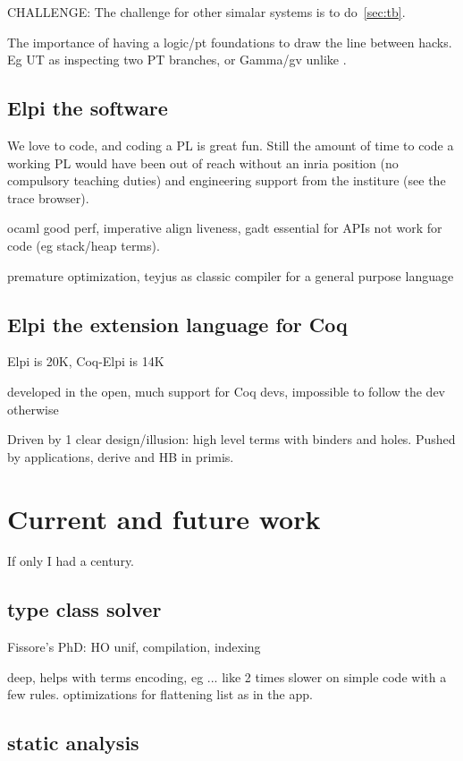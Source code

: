 \documentclass[a4paper, 11pt]{book}
\begin{document}
CHALLENGE: The challenge for other simalar systems is to do~\ref{sec:tb}.

The importance of having a logic/pt foundations to draw the line between hacks.
Eg UT as inspecting two PT branches, or Gamma/gv unlike \cite[Section 8 and later]{10.1145/3236788}.


\subsection{Elpi the software}

We love to code, and coding a PL is great fun. Still the amount of
time to code a working PL would have been out of reach without an inria position
(no compulsory teaching duties) and engineering support from the institure (see
the trace browser).

ocaml good perf, imperative align liveness, gadt essential for APIs not work for code (eg stack/heap terms).

premature optimization, teyjus as classic compiler for a general purpose language

\subsection{Elpi the extension language for Coq}

Elpi is 20K, Coq-Elpi is 14K

developed in the open, much support for Coq devs, impossible to follow the
dev otherwise

Driven by 1 clear design/illusion: high level terms with binders and holes.
Pushed by applications, derive and HB in primis.


\section{Current and future work}

If only I had a century.

\subsection{type class solver}

Fissore's PhD: HO unif, compilation, indexing

deep, helps with terms encoding, eg ...
like 2 times slower on simple code with a few rules.
optimizations for flattening list as in the app.


\subsection{static analysis}
\end{document}
